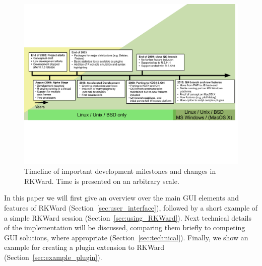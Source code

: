 \begin{figure}[htp]
 \centering
 \includegraphics[clip=true,trim=0cm 5.7cm 0cm 5.7cm,width=16cm]{../figures/timeline.pdf}
 \caption{Timeline of important development milestones and changes in RKWard.
          Time is presented on an arbitrary scale.}
 \label{fig:timeline}
\end{figure}

In this paper we will first give an overview over the main GUI elements and
features of RKWard (Section~\ref{sec:user_interface}), followed by a short example 
of a simple RKWard session (Section~\ref{sec:using_RKWard}). Next technical 
details of the implementation will be discussed, comparing them briefly to 
competing GUI solutions, where appropriate (Section~\ref{sec:technical}).
Finally, we show an example for creating a plugin extension to RKWard 
(Section~\ref{sec:example_plugin}).